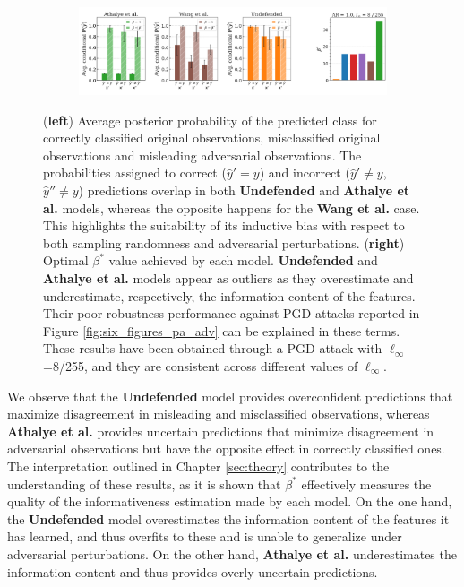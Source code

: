 \begin{figure}[H]
    \centering
    \begin{subfigure}[b]{\textwidth}
        \centering
        \includegraphics[width=\textwidth]{img/results_discussion/adversarial/bpda_wang_undefended_beta_pgd.png}
    \end{subfigure}
   
    \caption{(\textbf{left}) Average posterior probability of the predicted class for 
    correctly classified original observations, misclassified original observations and 
    misleading adversarial observations. The probabilities assigned to correct 
    ($\hat{y}' = y$) and incorrect ($\hat{y}' \neq y$, $\hat{y}'' \neq y$)
    predictions overlap in both {\color{tab:orange} \textbf{Undefended}} 
    and {\color{tab:green} \textbf{Athalye et al.}} models, whereas the opposite happens for the
    {\color{tab:brown} \textbf{Wang et al.}} case. This highlights
    the suitability of its inductive bias with respect to both sampling randomness and
    adversarial perturbations. (\textbf{right}) Optimal $\beta^{*}$ value achieved by each 
    model. {\color{tab:orange} \textbf{Undefended}} and {\color{tab:green} \textbf{Athalye et al.}} 
    models appear as outliers as they overestimate and underestimate, respectively, the 
    information content of the features. Their poor robustness performance against PGD attacks
    reported in Figure \ref{fig:six_figures_pa_adv} can be explained in these terms.
    These results have been obtained through a PGD attack with $\ell_\infty$=8/255,
    and they are consistent across different values of $\ell_\infty$.
    }
    \label{fig:unrobust_posterior_short_pgd}
\end{figure}

We observe that the {\color{tab:orange} \textbf{Undefended}} model provides overconfident 
predictions that maximize disagreement in misleading and 
misclassified observations, whereas {\color{tab:green} \textbf{Athalye et al.}} provides 
uncertain predictions that minimize disagreement in adversarial observations but have 
the opposite effect in correctly classified ones. The interpretation outlined in
Chapter \ref{sec:theory} contributes to the understanding of these results, as it is shown
that $\beta^{*}$ effectively measures the quality of the informativeness estimation 
made by each model. On the one hand, the {\color{tab:orange} \textbf{Undefended}} 
model overestimates the information content of the features it has learned, and thus overfits 
to these and is unable to generalize under adversarial perturbations. On the other hand, 
{\color{tab:green} \textbf{Athalye et al.}} underestimates the information content and thus
provides overly uncertain predictions. \\

